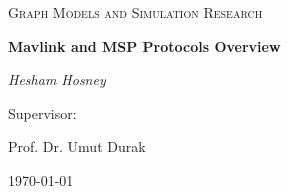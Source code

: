 \documentclass{report}
\begin{document}
\begin{titlepage}
	\centering
	{\scshape\LARGE  \par}
	\vspace{1cm}
	{\scshape\Large Graph Models and Simulation Research  \par}
	\vspace{1.5cm}
	{\huge\bfseries Mavlink and MSP Protocols Overview  \par}
	\vspace{1cm}
	{\huge\itshape Hesham Hosney\par}
        \vspace{2cm} 
	{\Large Supervisor:\par } 
	{\huge Prof. Dr. Umut Durak\par}
\vspace{.5cm} 

\vfill
	{\large \today\par}
\end{titlepage}


\cleardoublepage
\tableofcontents
\listoffigures
\cleardoublepage



\begin{abstract}


In this report, we briefly describe Mavlink and MSP protocols our main aim is to provide structured documentation, which maps the relation between Mavlink and MSP common messages. we will start with an introductory chapter discussing the main flight stack and commonly used technology, an overview of Mavlink Protocol, and Multiwii Serial protocol.
chapter 2 we will focus on our main goal which is mapping the messages between the two protocols.
We conclude our findings the conculsion chapter.


\end{abstract}
%







\end{document}
